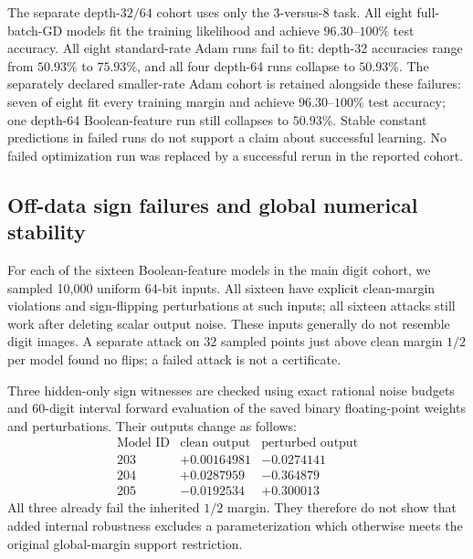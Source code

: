 The separate depth-$32/64$ cohort uses only the 3-versus-8 task. All eight
full-batch-GD models fit the training likelihood and achieve
$96.30$--$100\%$ test accuracy. All eight standard-rate Adam runs fail
to fit: depth-32 accuracies range from $50.93\%$ to $75.93\%$, and all
four depth-64 runs collapse to $50.93\%$. The separately declared
smaller-rate Adam cohort is retained alongside these failures: seven of
eight fit every training margin and achieve $96.30$--$100\%$ test accuracy;
one depth-64 Boolean-feature run still collapses to $50.93\%$.
Stable constant predictions in failed runs do not support a claim about
successful learning. No failed optimization run was replaced by a
successful rerun in the reported cohort.

\subsection{Off-data sign failures and global numerical stability}

For each of the sixteen Boolean-feature models in the main digit cohort,
we sampled 10,000 uniform 64-bit inputs. All sixteen have explicit
clean-margin violations and sign-flipping perturbations at such inputs;
all sixteen attacks still work after deleting scalar output noise.
These inputs generally do not resemble digit images. A separate attack
on 32 sampled points just above clean margin $1/2$ per model found no
flips; a failed attack is not a certificate.

Three hidden-only sign witnesses are checked using exact rational noise
budgets and 60-digit interval forward evaluation of the saved binary
floating-point weights and perturbations. Their outputs change as follows:
\[
 \begin{array}{c|rr}
 \text{Model ID}&\text{clean output}&\text{perturbed output}\\\hline
 203&+0.00164981&-0.0274141\\
 204&+0.0287959&-0.364879\\
 205&-0.0192534&+0.300013
 \end{array}
\]
All three already fail the inherited $1/2$ margin. They therefore do not
show that added internal robustness excludes a parameterization which
otherwise meets the original global-margin support restriction.

